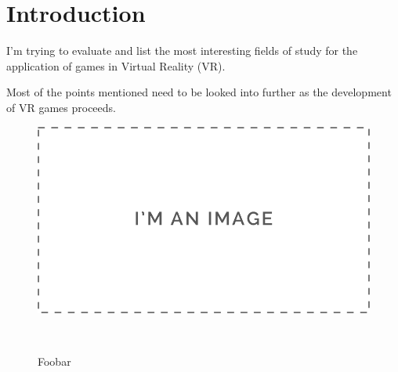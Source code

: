 \section{Introduction}
I'm trying to evaluate and list the most interesting fields of study for the application of games in Virtual Reality (VR).

Most of the  points mentioned need to be looked into further as the development of VR games proceeds.

\begin{figure}
	\centering
	\includegraphics[width=0.9\columnwidth]{./figures/placeholder}
	\caption{Foobar}~\label{fig:figure1}
\end{figure}
